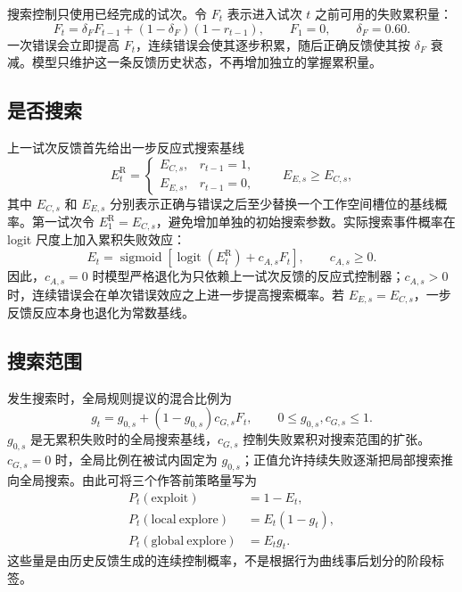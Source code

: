 \documentclass[12pt]{article}
\newcommand{\logit}{\operatorname{logit}}
\newcommand{\sigmoid}{\operatorname{sigmoid}}
\begin{document}
搜索控制只使用已经完成的试次。令 $F_t$ 表示进入试次 $t$ 之前可用的失败累积量：
\begin{equation}
F_t
=\delta_F F_{t-1}+(1-\delta_F)(1-r_{t-1}),
\qquad
F_1=0,
\qquad
\delta_F=0.60.
\label{eq:failure-accumulator}
\end{equation}
一次错误会立即提高 $F_t$，连续错误会使其逐步积累，随后正确反馈使其按 $\delta_F$ 衰减。模型只维护这一条反馈历史状态，不再增加独立的掌握累积量。

\subsection{是否搜索}

上一试次反馈首先给出一步反应式搜索基线
\begin{equation}
E_t^{\mathrm R}
=
\begin{cases}
E_{C,s}, & r_{t-1}=1,\\
E_{E,s}, & r_{t-1}=0,
\end{cases}
\qquad
E_{E,s}\geq E_{C,s},
\label{eq:reactive-event}
\end{equation}
其中 $E_{C,s}$ 和 $E_{E,s}$ 分别表示正确与错误之后至少替换一个工作空间槽位的基线概率。第一试次令 $E_1^{\mathrm R}=E_{C,s}$，避免增加单独的初始搜索参数。实际搜索事件概率在 logit 尺度上加入累积失败效应：
\begin{equation}
E_t
=\sigmoid\!\left[
\logit(E_t^{\mathrm R})+c_{A,s}F_t
\right],
\qquad
c_{A,s}\geq0.
\label{eq:accumulated-event}
\end{equation}
因此，$c_{A,s}=0$ 时模型严格退化为只依赖上一试次反馈的反应式控制器；$c_{A,s}>0$ 时，连续错误会在单次错误效应之上进一步提高搜索概率。若 $E_{E,s}=E_{C,s}$，一步反馈反应本身也退化为常数基线。

\subsection{搜索范围}

发生搜索时，全局规则提议的混合比例为
\begin{equation}
g_t
=g_{0,s}+(1-g_{0,s})c_{G,s}F_t,
\qquad
0\leq g_{0,s},c_{G,s}\leq1.
\label{eq:global-search}
\end{equation}
$g_{0,s}$ 是无累积失败时的全局搜索基线，$c_{G,s}$ 控制失败累积对搜索范围的扩张。$c_{G,s}=0$ 时，全局比例在被试内固定为 $g_{0,s}$；正值允许持续失败逐渐把局部搜索推向全局搜索。由此可将三个作答前策略量写为
\begin{align}
P_t(\mathrm{exploit})&=1-E_t,
\nonumber\\
P_t(\mathrm{local\ explore})&=E_t(1-g_t),
\nonumber\\
P_t(\mathrm{global\ explore})&=E_tg_t.
\label{eq:strategy-probabilities}
\end{align}
这些量是由历史反馈生成的连续控制概率，不是根据行为曲线事后划分的阶段标签。
\end{document}
